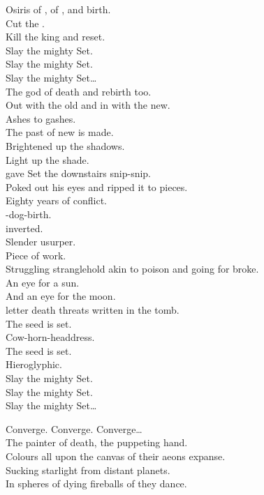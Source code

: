Osiris of , of , and birth. \\
Cut the . \\
Kill the king and reset. \\

Slay the mighty Set. \\
Slay the mighty Set. \\
Slay the mighty Set… \\

The god of death and rebirth too. \\
Out with the old and in with the new. \\
Ashes to gashes. \\
The past of new  is made. \\
Brightened up the shadows. \\
Light up the shade. \\
 gave Set the downstairs snip-snip. \\
Poked out his eyes and ripped it to pieces. \\
Eighty years of conflict. \\
-dog-birth. \\
 inverted. \\
Slender usurper. \\
Piece of work. \\
Struggling stranglehold akin to poison and going for broke. \\
An eye for a sun. \\
And an eye for the moon. \\
 letter death threats written in the tomb. \\

The seed is set. \\
Cow-horn-headdress. \\
The seed is set. \\
Hieroglyphic. \\

Slay the mighty Set. \\
Slay the mighty Set. \\
Slay the mighty Set… \\


Converge. Converge. Converge… \\

The painter of death, the puppeting hand. \\
Colours all upon the canvas of their aeons expanse. \\
Sucking starlight from distant planets. \\
In spheres of dying fireballs of  they dance. \\

